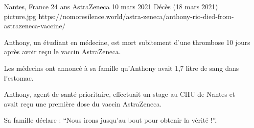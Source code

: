 {Nantes, France}
{24 ans}
{AstraZeneca}
{10 mars 2021}
{Décès (18 mars 2021)}
{picture.jpg}
{https://nomoresilence.world/astra-zeneca/anthony-rio-died-from-astrazeneca-vaccine/}
{

Anthony, un étudiant en médecine, est mort subitement d'une thrombose 10 jours
après avoir reçu le vaccin AstraZeneca.

Les médecins ont annoncé à sa famille qu'Anthony avait 1,7 litre de sang dans
l'estomac.

Anthony, agent de santé prioritaire, effectuait un stage au CHU de Nantes et
avait reçu une première dose du vaccin AstraZeneca.

Sa famille déclare : “Nous irons jusqu'au bout pour obtenir la vérité !”.

}
